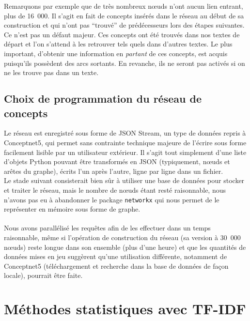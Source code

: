 \documentclass[a4paper, 12pt]{article}
\newcommand{\pyt}[1]{\texttt{#1}}%
\begin{document}
Remarquons par exemple que de très nombreux n\oe{}uds n'ont aucun lien entrant, plus de 16~000. Il s'agit en fait de concepts insérés dans le réseau au début de sa construction et qui n'ont pas ``trouvé'' de prédécesseurs lors des étapes suivantes. Ce n'est pas un défaut majeur. Ces concepts ont été trouvés dans nos textes de départ et l'on s'attend à les retrouver tels quels dans d'autres textes. Le plus important, d'obtenir une information en \textit{partant} de ces concepts, est acquis puisqu'ils possèdent des arcs sortants. En revanche, ils ne seront pas activés si on ne les trouve pas dans un texte.


\subsection{Choix de programmation du réseau de concepts}

Le réseau est enregistré sous forme de JSON Stream, un type de données repris à Conceptnet5, qui permet sans contrainte technique majeure de l'écrire sous forme facilement lisible par un utilisateur extérieur. Il s'agit tout simplement d'une liste d'objets Python pouvant être transformés en JSON (typiquement, n\oe{}uds et arêtes du graphe), écrits l'un après l'autre, ligne par ligne dans un fichier.\\

Le stade suivant consisterait bien sûr à utiliser une base de données pour stocker et traiter le réseau, mais le nombre de n\oe{}uds étant resté raisonnable, nous n'avons pas eu à abandonner le package \pyt{networkx} qui nous permet de le représenter en mémoire sous forme de graphe.

\paragraph{}
Nous avons parallélisé les requêtes afin de les effectuer dans un temps raisonnable, même si l'opération de construction du réseau (sa version à 30~000 n\oe{}uds) reste longue dans son ensemble (plus d'une heure) et que les quantités de données mises en jeu suggèrent qu'une utilisation différente, notamment de Conceptnet5 (téléchargement et recherche dans la base de données de façon locale), pourrait être faite.



\section{Méthodes statistiques avec TF-IDF}\label{Section:TFIDF}
\end{document}
